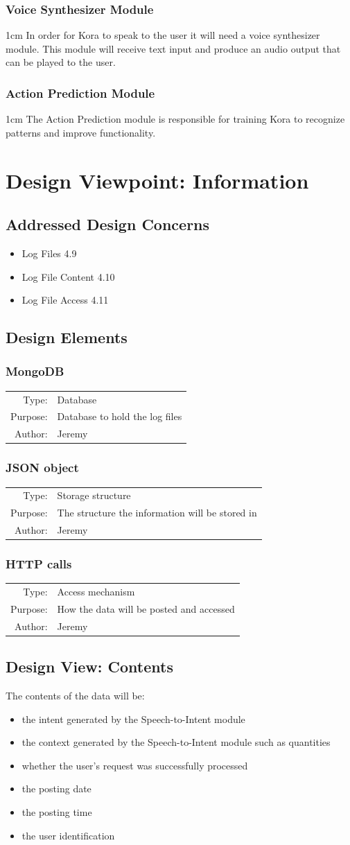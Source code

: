 \documentclass[onecolumn, draftclsnofoot,10pt, compsoc]{IEEEtran}
\def \botname{Kora\xspace}
\newenvironment{indentItem}[1][1cm]{\begin{adjustwidth}{#1}{}}{\end{adjustwidth}}
\newcommand{\designConcernRef}[2][]{
    #2 #1
}
\newcommand{\designElementDef}[4]{
    \subsubsection{#1}
    \begin{tabular}[t]{r p{6in}}
        Type: & #2 \\
        Purpose: & #3 \\
        Author: & #4 \\
    \end{tabular}
}
\begin{document}
		\subsubsection{Voice Synthesizer Module}
			\begin{indentItem}
				In order for \botname to speak to the user it will need a voice synthesizer module.
				This module will receive text input and produce an audio output that can be played to the user.
			\end{indentItem}		
		\subsubsection{Action Prediction Module}
			\begin{indentItem}
				The Action Prediction module is responsible for training \botname to recognize patterns and improve functionality.
			\end{indentItem}
		
\section{Design Viewpoint: Information}
	\subsection{Addressed Design Concerns}
		\begin{itemize}
			\item \designConcernRef[4.9]{Log Files}
			\item \designConcernRef[4.10]{Log File Content}
			\item \designConcernRef[4.11]{Log File Access}
		\end{itemize}


	\subsection{Design Elements}
		\designElementDef{MongoDB}{Database}{Database to hold the log files}{Jeremy}
		\designElementDef{JSON object}{Storage structure}{The structure the information will be stored in}{Jeremy}
		\designElementDef{HTTP calls}{Access mechanism}{How the data will be posted and accessed}{Jeremy}
	
	\subsection{Design View: Contents}
		The contents of the data will be:
		\begin{itemize}
			\item the intent generated by the Speech-to-Intent module
			\item the context generated by the Speech-to-Intent module such as quantities
			\item whether the user's request was successfully processed
			\item the posting date
			\item the posting time
			\item the user identification
		\end{itemize}
	
\end{document}
